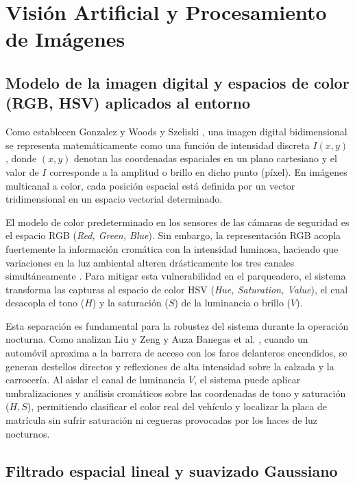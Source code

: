 \section{Visión Artificial y Procesamiento de Imágenes}

\subsection{Modelo de la imagen digital y espacios de color (RGB, HSV) aplicados
al entorno}

Como establecen Gonzalez y Woods \cite{gonzalez2018digital} y Szeliski
\cite{szeliski2022computer}, una imagen digital bidimensional se representa
matemáticamente como una función de intensidad discreta $I(x, y)$, donde $(x, y)$
denotan las coordenadas espaciales en un plano cartesiano y el valor de $I$
corresponde a la amplitud o brillo en dicho punto (píxel). En imágenes multicanal
a color, cada posición espacial está definida por un vector tridimensional en un
espacio vectorial determinado.

El modelo de color predeterminado en los sensores de las cámaras de seguridad es
el espacio RGB (\textit{Red, Green, Blue}). Sin embargo, la representación RGB
acopla fuertemente la información cromática con la intensidad luminosa, haciendo
que variaciones en la luz ambiental alteren drásticamente los tres canales
simultáneamente \cite{gonzalez2018digital}. Para mitigar esta vulnerabilidad en
el parqueadero, el sistema transforma las capturas al espacio de color HSV
(\textit{Hue, Saturation, Value}), el cual desacopla el tono ($H$) y la
saturación ($S$) de la luminancia o brillo ($V$).

Esta separación es fundamental para la robustez del sistema durante la operación
nocturna. Como analizan Liu y Zeng \cite{liu2017vehiclecounting} y Auza Banegas
et al. \cite{auzabanegas2026blpr}, cuando un automóvil aproxima a la barrera de
acceso con los faros delanteros encendidos, se generan destellos directos y
reflexiones de alta intensidad sobre la calzada y la carrocería. Al aislar el
canal de luminancia $V$, el sistema puede aplicar umbralizaciones y análisis
cromáticos sobre las coordenadas de tono y saturación ($H, S$), permitiendo
clasificar el color real del vehículo y localizar la placa de matrícula sin
sufrir saturación ni cegueras provocadas por los haces de luz nocturnos.

\subsection{Filtrado espacial lineal y suavizado Gaussiano}

